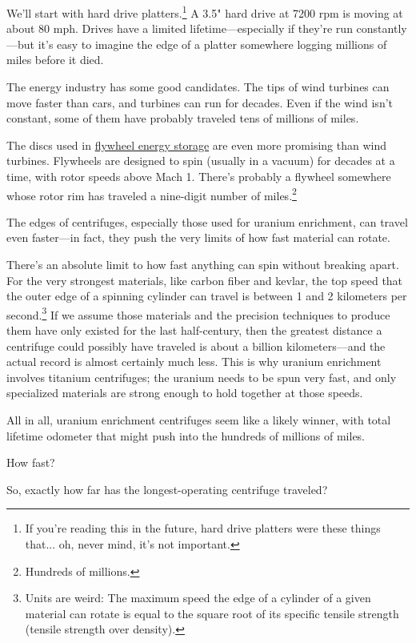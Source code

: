 {{We'll start with hard drive platters.{\footnote{If you're reading this in the future, hard drive platters were these things that... oh, never mind, it's not important.} } A 3.5" hard drive at 7200 rpm is moving at about 80 mph. Drives have a limited lifetime—especially if they're run constantly—but it's easy to imagine the edge of a platter somewhere logging millions of miles before it died.}

{The energy industry has some good candidates. The tips of wind turbines can move faster than cars, and turbines can run for decades. Even if the wind isn't constant, some of them have probably traveled tens of millions of miles.}

{The discs used in \href{https://en.wikipedia.org/wiki/Flywheel\_energy\_storage}{flywheel energy storage} are even more promising than wind turbines. Flywheels are designed to spin (usually in a vacuum) for decades at a time, with rotor speeds above Mach 1. There's probably a flywheel somewhere whose rotor rim has traveled a nine-digit number of miles.{\footnote{Hundreds of millions.} } }

{The edges of centrifuges, especially those used for uranium enrichment, can travel even faster—in fact, they push the very limits of how fast material can rotate.}

{There's an absolute limit to how fast anything can spin without breaking apart. For the very strongest materials, like carbon fiber and kevlar, the top speed that the outer edge of a spinning cylinder can travel is between 1 and 2 kilometers per second.{\footnote{Units are weird: The maximum speed the edge of a cylinder of a given material can rotate is equal to the square root of its specific tensile strength (tensile strength over density).} } If we assume those materials and the precision techniques to produce them have only existed for the last half-century, then the greatest distance a centrifuge could possibly have traveled is about a billion kilometers—and the actual record is almost certainly much less. This is why uranium enrichment involves titanium centrifuges; the uranium needs to be spun very fast, and only specialized materials are strong enough to hold together at those speeds.}

{All in all, uranium enrichment centrifuges seem like a likely winner, with total lifetime odometer that might push into the hundreds of millions of miles.}

{How fast?}

{So, exactly how far has the longest-operating centrifuge traveled?}

}
